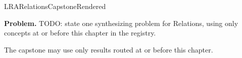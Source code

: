 \ifcsname LRARelationsCapstoneRendered\endcsname
\else
\expandafter\gdef\csname LRARelationsCapstoneRendered\endcsname{}

\newpage
{}
\label{cap:relations}

\begin{tcolorbox}[
  colback=gray!6,
  colframe=gray!40,
  arc=2pt,
  left=8pt, right=8pt, top=6pt, bottom=6pt,
  title={\small\textbf{Capstone Problem}},
  fonttitle=\small\bfseries
]
\textbf{Problem.}
TODO: state one synthesizing problem for Relations, using only concepts at or
before this chapter in the registry.
\end{tcolorbox}

\begin{remark*}
The capstone may use only results routed at or before this chapter.
\end{remark*}

\clearpage
\fi
